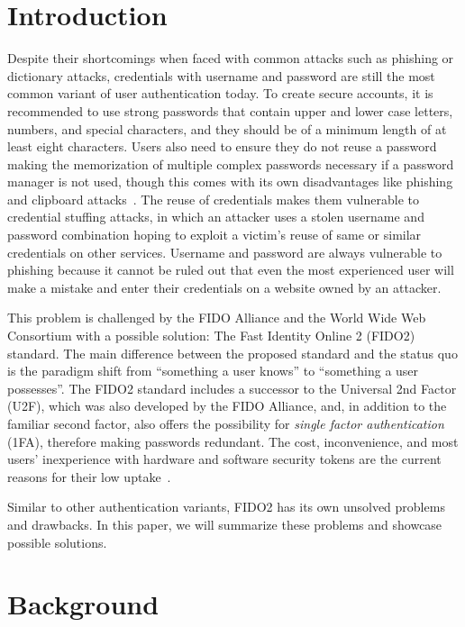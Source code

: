 \documentclass[runningheads]{llncs}
\begin{document}
\section{Introduction}
Despite their shortcomings when faced with common attacks such as phishing or dictionary attacks, credentials with username and password are still the most common variant of user authentication today. To create secure accounts, it is recommended to use strong passwords that contain upper and lower case letters, numbers, and special characters, and they should be of a minimum length of at least eight characters. Users also need to ensure they do not reuse a password making the memorization of multiple complex passwords necessary if a password manager is not used, though this comes with its own disadvantages like phishing and clipboard attacks~\cite{8326801}. The reuse of credentials makes them vulnerable to credential stuffing attacks, in which an attacker uses a stolen username and password combination hoping to exploit a victim's reuse of same or similar credentials on other services. Username and password are always vulnerable to phishing because it cannot be ruled out that even the most experienced user will make a mistake and enter their credentials on a website owned by an attacker.

This problem is challenged by the FIDO Alliance and the World Wide Web Consortium with a possible solution: The Fast Identity Online 2 (FIDO2) standard. The main difference between the proposed standard and the status quo is the paradigm shift from ``something a user knows'' to ``something a user possesses''. The FIDO2 standard includes a successor to the Universal 2nd Factor (U2F), which was also developed by the FIDO Alliance, and, in addition to the familiar second factor, also offers the possibility for \textit{single factor authentication} (1FA), therefore making passwords redundant. The cost, inconvenience, and most users' inexperience with hardware and software security tokens are the current reasons for their low uptake~\cite{274547,9152694}.

Similar to other authentication variants, FIDO2 has its own unsolved problems and drawbacks. In this paper, we will summarize these problems and showcase possible solutions. 

\section{Background}
\end{document}
